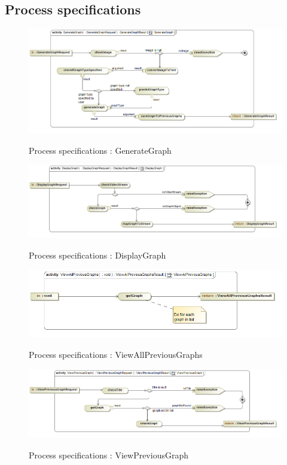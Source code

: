\documentclass[a4paper,12pt]{article}
\begin{document}
\subsection{Process specifications}
	\begin{figure}[H]
		\includegraphics[width=\textwidth]{Images/act__GenerateGraph__GenerateGraph.png}  \\
		\caption{Process specifications : GenerateGraph}
	\end{figure}
	\begin{figure}[H]
		\includegraphics[width=\textwidth]{Images/act__DisplayGraph__DisplayGraph.png}  \\
		\caption{Process specifications : DisplayGraph}
	\end{figure}
	\begin{figure}[H]
		\includegraphics[width=\textwidth]{Images/act__ViewAllPreviousGraphs__ViewAllPreviousGraphs.png}  \\
		\caption{Process specifications : ViewAllPreviousGraphs}
	\end{figure}
	\begin{figure}[H]
		\includegraphics[width=\textwidth]{Images/act__ViewPreviousGraph__ViewPreviousGraph.png}  \\
		\caption{Process specifications : ViewPreviousGraph}
	\end{figure}
	
\end{document}
